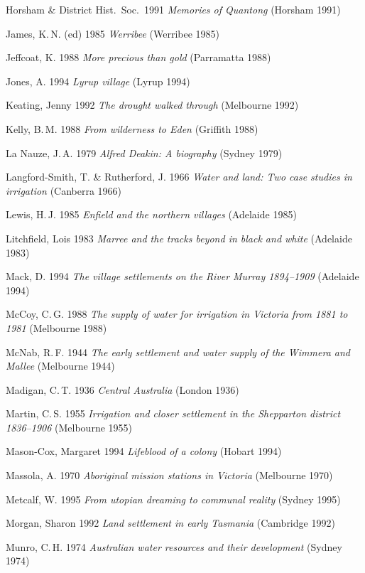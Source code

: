 Horsham \& District Hist.\ Soc.\ 1991 \textsl{Memories of Quantong}
(Horsham 1991)

James, K.\,N. (ed) 1985 \textsl{Werribee} (Werribee 1985)

Jeffcoat, K. 1988 \textsl{More precious than gold} (Parramatta 1988)

Jones, A. 1994 \textsl{Lyrup village} (Lyrup 1994)

Keating, Jenny 1992 \textsl{The drought walked through} (Melbourne
1992)

Kelly, B.\,M. 1988 \textsl{From wilderness to Eden} (Griffith 1988)

La Nauze, J.\,A. 1979 \textsl{Alfred Deakin: A biography} (Sydney
1979)

Langford-Smith, T. \& Rutherford, J. 1966 \textsl{Water and land: Two
case studies in irrigation} (Canberra 1966)

Lewis, H.\,J. 1985 \textsl{Enfield and the northern villages}
(Adelaide 1985)

Litchfield, Lois 1983 \textsl{Marree and the tracks beyond in black
and white} (Adelaide 1983)

Mack, D.  1994 \textsl{The village settlements on the River Murray
1894--1909} (Adelaide 1994)

McCoy, C.\,G.  1988 \textsl{The supply of water for irrigation in
Victoria from 1881 to 1981} (Melbourne 1988)

McNab, R.\,F. 1944 \textsl{The early settlement and water supply of
the Wimmera and Mallee} (Melbourne 1944)

Madigan, C.\,T. 1936 \textsl{Central Australia} (London 1936)

Martin, C.\,S.  1955 \textsl{Irrigation and closer settlement in the
Shepparton district 1836--1906} (Melbourne 1955)

Mason-Cox, Margaret 1994 \textsl{Lifeblood of a colony} (Hobart 1994)

Massola, A. 1970 \textsl{Aboriginal mission stations in Victoria}
(Melbourne 1970)

Metcalf, W. 1995 \textsl{From utopian dreaming to communal reality}
(Sydney 1995)

Morgan, Sharon 1992 \textsl{Land settlement in early Tasmania}
(Cambridge 1992)

Munro, C.\,H. 1974 \textsl{Australian water resources and their
development} (Sydney 1974)

